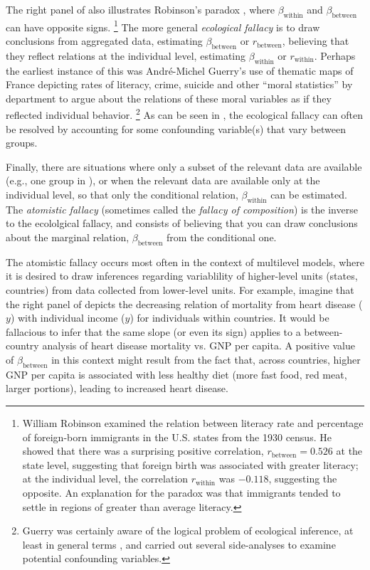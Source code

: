 The right panel of  also illustrates Robinson's paradox \citep{Robinson:1950},
where $\beta_{\textrm{within}}$ and $\beta_{\textrm{between}}$ can have opposite signs.%
\footnote{
William Robinson \citeyearpar{Robinson:1950} examined the relation between literacy rate and percentage
of foreign-born immigrants in the U.S. states from the 1930 census.  
He showed that there was a surprising
positive correlation, $r_{\textrm{between}}= 0.526$ at the state level,
suggesting that foreign birth was associated with greater literacy;
at the individual level, the correlation $r_{\textrm{within}}$ was $-0.118$, suggesting the opposite.
An explanation for the paradox was that immigrants tended to settle in regions of greater than
average literacy.
}
The more general \emph{ecological fallacy} \citep{Freedman:01}
is to draw conclusions from aggregated data, estimating
$\beta_{\textrm{between}}$ or $r_{\textrm{between}}$, believing that they reflect relations
at the individual level, estimating $\beta_{\textrm{within}}$ or $r_{\textrm{within}}$.
Perhaps the earliest instance of this was Andr\'e-Michel Guerry's \citeyearpar{Guerry:1833} use of thematic maps of
France depicting rates of literacy, crime, suicide and other ``moral statistics'' by department to argue 
about the relations of these moral variables as if they reflected individual behavior.%
\footnote{
Guerry was certainly aware of the logical problem of ecological inference, at least in general terms
\citep{Friendly:07:guerry}, and carried out several side-analyses to examine potential confounding
variables.  
}
As can be seen in , the ecological fallacy can often be resolved
by accounting for some confounding variable(s) that vary between groups.

Finally, there are situations where only a subset of the relevant data are available (e.g.,
one group in ), or when the relevant data are available only
at the individual level,
so that only the conditional relation,
$\beta_{\textrm{within}}$ can be estimated. The \emph{atomistic fallacy} 
(sometimes called the \emph{fallacy of composition})
is the inverse to the
ecololgical fallacy, and consists of believing that you can draw conclusions
about the marginal relation, $\beta_{\textrm{between}}$ from the conditional one.

The atomistic fallacy occurs most often in the context of multilevel models,
where it is desired to draw inferences regarding variablility of higher-level units
(states, countries) from data collected from lower-level units.
For example, imagine that the right panel of  depicts the decreasing
relation of mortality from heart disease ($y$) with individual income ($y$) for
individuals within countries. It would be fallacious to infer that the same slope
(or even its sign) applies to a between-country analysis of heart disease mortality vs.
GNP per capita. A positive value of $\beta_{\textrm{between}}$ in this context might
result from the fact that, across countries, higher GNP per capita is associated with 
less healthy diet (more fast food, red meat, larger portions), leading to increased heart disease.
 
